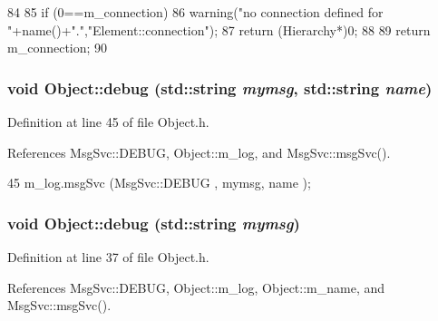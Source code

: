 \begin{DoxyCode}
84                               {
85   if (0==m_connection){
86     warning("no connection defined for "+name()+".","Element::connection");
87     return (Hierarchy*)0;
88   }
89   return m_connection;
90 }
\end{DoxyCode}
\hypertarget{classObject_a6c9a0397ca804e04d675ed05683f5420}{
\subsubsection[{debug}]{\setlength{\rightskip}{0pt plus 5cm}void Object::debug (std::string {\em mymsg}, \/  std::string {\em name})}}
\label{classObject_a6c9a0397ca804e04d675ed05683f5420}


Definition at line 45 of file Object.h.

References MsgSvc::DEBUG, Object::m\_\-log, and MsgSvc::msgSvc().


\begin{DoxyCode}
45 { m_log.msgSvc (MsgSvc::DEBUG   , mymsg, name ); }
\end{DoxyCode}
\hypertarget{classObject_aac010553f022165573714b7014a15f0d}{
\subsubsection[{debug}]{\setlength{\rightskip}{0pt plus 5cm}void Object::debug (std::string {\em mymsg})}}
\label{classObject_aac010553f022165573714b7014a15f0d}


Definition at line 37 of file Object.h.

References MsgSvc::DEBUG, Object::m\_\-log, Object::m\_\-name, and MsgSvc::msgSvc().

